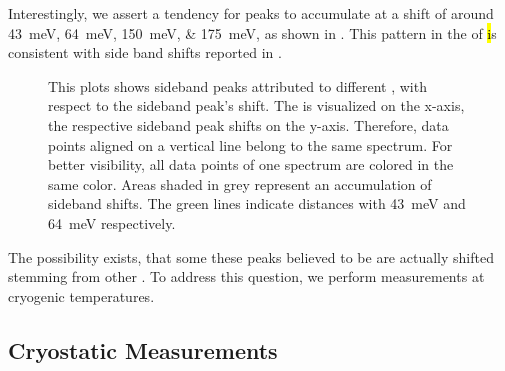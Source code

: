 		Interestingly, we assert a tendency for peaks to accumulate at a shift of around \SIlist{43;64;150;175}{meV}, as shown in . This pattern in the \psb of \hl is consistent with side band shifts reported in \cite{Sternschulte1994,Zaitsev2000, Neu2011}.

		\begin{figure}[!htb]
			\centering
			\caption[Accumulation of sideband peaks]{This plots shows sideband peaks attributed to different \ZPL \cwls, with respect to the sideband peak's shift. The \ZPL \cwl is visualized on the x-axis, the respective sideband peak shifts on the y-axis. Therefore, data points aligned on a vertical line belong to the same spectrum. For better visibility, all data points of one spectrum are colored in the same color. Areas shaded in grey represent an accumulation of sideband shifts. The green lines indicate distances with \SI{43}{meV} and \SI{64}{meV} respectively.}
			\label{fig::multiple_sb_peaks}
		\end{figure}

		The possibility exists, that some these peaks believed to be \psbs are actually shifted \ZPLs stemming from other \sivs. To address this question, we perform \pl measurements at cryogenic temperatures.


		\subsection{Cryostatic Measurements}\label{subsec::cryo}

